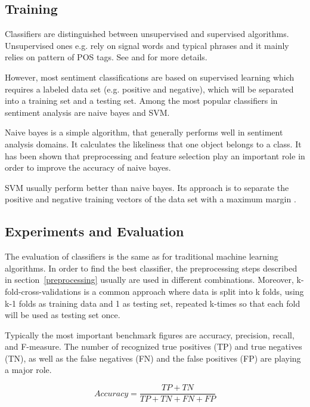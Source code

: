 \documentclass{acm_proc_article-sp}
\begin{document}
\subsection{Training}
Classifiers are distinguished between unsupervised and supervised algorithms. Unsupervised ones e.g. rely on signal words and typical phrases and it mainly relies on pattern of POS tags. See \cite{liu2010sentimentanalysis} and \cite{pang2008opinion} for more details.

However, most sentiment classifications are based on supervised learning which requires a labeled data set (e.g. positive and negative), which will be separated into a training set and a testing set. Among the most popular classifiers in sentiment analysis are naive bayes and SVM. 

Naive bayes is a simple algorithm, that generally performs well in sentiment analysis domains. It calculates the likeliness that one object belongs to a class. It has been shown that preprocessing and feature selection play an important role in order to improve the accuracy of naive bayes.
\cite{ye2009sentiment, ting2011naive}

SVM usually perform better than naive bayes. Its approach is to separate the positive and negative training vectors of the data set with a maximum margin  \cite{ye2009sentiment}.

\subsection{Experiments and Evaluation}
The evaluation of classifiers is the same as for traditional machine learning algorithms. In order to find the best classifier, the preprocessing steps described in section~\ref{preprocessing} usually are used in different combinations. Moreover, k-fold-cross-validations is a common approach where data is split into k folds, using k-1 folds as training data and 1 as testing set, repeated k-times so that each fold will be used as testing set once. 

Typically the most important benchmark figures are accuracy, precision, recall, and F-measure. The number of recognized true positives (TP) and true negatives (TN), as well as the false negatives (FN) and the false positives (FP) are playing a major role.
\cite{haddi2013therole, ting2011naive, sokolova2006beyond, pak2010twitter, ye2009sentiment}


\begin{equation}
Accuracy = \frac{TP+TN}{TP+TN+FN+FP}
\end{equation}
\end{document}
